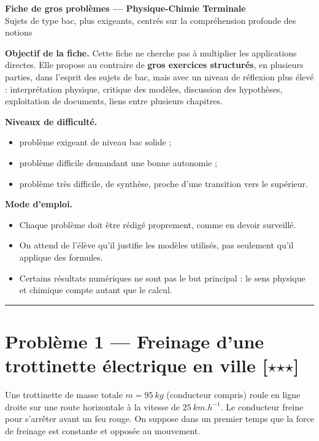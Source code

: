 \documentclass[11pt,a4paper]{article}
\newcommand{\etoile}{\ensuremath{\star}}
\begin{document}
\begin{center}
    {\LARGE \textbf{Fiche de gros problèmes --- Physique-Chimie Terminale}}\\[0.4em]
    {\large Sujets de type bac, plus exigeants, centrés sur la compréhension profonde des notions}
\end{center}

\textbf{Objectif de la fiche.} Cette fiche ne cherche pas à multiplier les applications directes. Elle propose au contraire de \textbf{gros exercices structurés}, en plusieurs parties, dans l'esprit des sujets de bac, mais avec un niveau de réflexion plus élevé : interprétation physique, critique des modèles, discussion des hypothèses, exploitation de documents, liens entre plusieurs chapitres.

\textbf{Niveaux de difficulté.}
\begin{itemize}[leftmargin=1.5em]
    \item [\etoile\etoile\etoile] problème exigeant de niveau bac solide ;
    \item [\etoile\etoile\etoile\etoile] problème difficile demandant une bonne autonomie ;
    \item [\etoile\etoile\etoile\etoile\etoile] problème très difficile, de synthèse, proche d'une transition vers le supérieur.
\end{itemize}

\textbf{Mode d'emploi.}
\begin{itemize}[leftmargin=1.5em]
    \item Chaque problème doit être rédigé proprement, comme en devoir surveillé.
    \item On attend de l'élève qu'il justifie les modèles utilisés, pas seulement qu'il applique des formules.
    \item Certains résultats numériques ne sont pas le but principal : le sens physique et chimique compte autant que le calcul.
\end{itemize}

\hrule

\section*{Problème 1 --- Freinage d'une trottinette électrique en ville \hfill [\etoile\etoile\etoile]}

Une trottinette de masse totale $m=95\ \si{kg}$ (conducteur compris) roule en ligne droite sur une route horizontale à la vitesse de $\SI{25}{km.h^{-1}}$.
Le conducteur freine pour s'arrêter avant un feu rouge.
On suppose dans un premier temps que la force de freinage est constante et opposée au mouvement.
\end{document}
